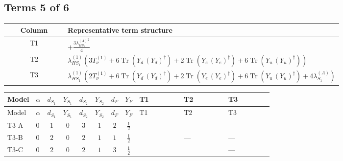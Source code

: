\documentclass[8pt]{article}
\begin{document}
\begin{landscape}
\subsection*{Terms 5 of 6}
\begin{center}
\begin{tabular}{@{}c >{\raggedright\arraybackslash}p{0.82\linewidth}@{}}
\toprule
Column & Representative term structure \\
\midrule
T1 & \(\displaystyle +\frac{3 {\lambda_{HS_1}^{(A)}}^2}{4}\) \\
\midrule
T2 & \(\displaystyle {\lambda_{HS_1}^{(1)}} (3 T_{\nu}^{(1)}+6 \operatorname{Tr}\!\left({Y_d}\,\left({Y_d}\right)^{\dagger}\right)+2 \operatorname{Tr}\!\left({Y_e}\,\left({Y_e}\right)^{\dagger}\right)+6 \operatorname{Tr}\!\left({Y_u}\,\left({Y_u}\right)^{\dagger}\right))\) \\
\midrule
T3 & \(\displaystyle {\lambda_{HS_1}^{(1)}} (2 T_{\nu}^{(1)}+6 \operatorname{Tr}\!\left({Y_d}\,\left({Y_d}\right)^{\dagger}\right)+2 \operatorname{Tr}\!\left({Y_e}\,\left({Y_e}\right)^{\dagger}\right)+6 \operatorname{Tr}\!\left({Y_u}\,\left({Y_u}\right)^{\dagger}\right)+4 {\lambda_{S_1}^{(A)}})\) \\
\midrule
\bottomrule
\end{tabular}
\end{center}
\smallskip
\tiny
\begin{longtable}{@{}llcccccc >{\raggedright\arraybackslash}p{0.21\linewidth} >{\raggedright\arraybackslash}p{0.21\linewidth} >{\raggedright\arraybackslash}p{0.21\linewidth}@{}}
\toprule
Model & $\alpha$ & $d_{S_1}$ & $Y_{S_1}$ & $d_{S_2}$ & $Y_{S_2}$ & $d_F$ & $Y_F$ & T1 & T2 & T3 \\
\midrule
\endfirsthead
\toprule
Model & $\alpha$ & $d_{S_1}$ & $Y_{S_1}$ & $d_{S_2}$ & $Y_{S_2}$ & $d_F$ & $Y_F$ & T1 & T2 & T3 \\
\midrule
\endhead
T3-A & $0$ & $1$ & $0$ & $3$ & $1$ & $2$ & $\frac{1}{2}$ & --- & --- & --- \\
\midrule
T3-B & $0$ & $2$ & $0$ & $2$ & $1$ & $1$ & $\frac{1}{2}$ & \scriptsize\adjustbox{max width=\linewidth}{$\begin{gathered} +\frac{3 {\lambda_{HS_1}^{(A)}}^2}{4}\end{gathered}$} & --- & --- \\
\midrule
T3-C & $0$ & $2$ & $0$ & $2$ & $1$ & $3$ & $\frac{1}{2}$ & \scriptsize\adjustbox{max width=\linewidth}{$\begin{gathered} +\frac{3 {\lambda_{HS_1}^{(A)}}^2}{4}\end{gathered}$} & \scriptsize\adjustbox{max width=\linewidth}{$\begin{gathered} {\lambda_{HS_1}^{(1)}} (3 T_{\nu}^{(1)}+6 \operatorname{Tr}\!\left({Y_d}\,\left({Y_d}\right)^{\dagger}\right)+2 \operatorname{Tr}\!\left({Y_e}\,\left({Y_e}\right)^{\dagger}\right)+6 \operatorname{Tr}\!\left({Y_u}\,\left({Y_u}\right)^{\dagger}\right))\end{gathered}$} & --- \\

\end{longtable}
\end{landscape}
\end{document}
